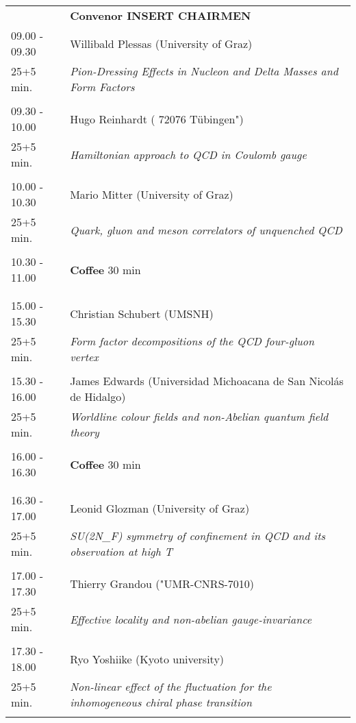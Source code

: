 \begin{longtable}{p{3cm}p{13cm}}
&\hfill {\bf Convenor INSERT CHAIRMEN }\\ 
09.00 - 09.30 & Willibald Plessas (University of Graz)\\ 
25+5 min. & {\it Pion-Dressing Effects in Nucleon and Delta Masses and Form Factors}\\ 
 & \\ 
09.30 - 10.00 & Hugo Reinhardt ( 72076 Tübingen")\\ 
25+5 min. & {\it Hamiltonian approach to QCD in Coulomb gauge}\\ 
 & \\ 
10.00 - 10.30 & Mario Mitter (University of Graz)\\ 
25+5 min. & {\it Quark, gluon and meson correlators of unquenched QCD}\\ 
 & \\ 
10.30 - 11.00 & {\bf Coffee} \hfill 30 min \\ 
 & \\ 
 & \\ 
15.00 - 15.30 & Christian Schubert (UMSNH)\\ 
25+5 min. & {\it Form factor decompositions of the QCD four-gluon vertex}\\ 
 & \\ 
15.30 - 16.00 & James Edwards (Universidad Michoacana de San Nicolás de Hidalgo)\\ 
25+5 min. & {\it Worldline colour fields and non-Abelian quantum field theory}\\ 
 & \\ 
16.00 - 16.30 & {\bf Coffee} \hfill 30 min \\ 
 & \\ 
 & \\ 
16.30 - 17.00 & Leonid Glozman (University of Graz)\\ 
25+5 min. & {\it SU(2N\_F) symmetry of confinement in QCD and its observation at high T}\\ 
 & \\ 
17.00 - 17.30 & Thierry Grandou ("UMR-CNRS-7010)\\ 
25+5 min. & {\it Effective locality and non-abelian gauge-invariance}\\ 
 & \\ 
17.30 - 18.00 & Ryo Yoshiike (Kyoto university)\\ 
25+5 min. & {\it Non-linear effect of the fluctuation for the inhomogeneous chiral phase transition}\\ 
 & \\ 
\end{longtable}

